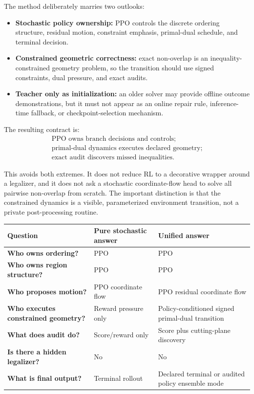 \documentclass[11pt]{article}
\begin{document}
The method deliberately marries two outlooks:
\begin{itemize}
    \item \textbf{Stochastic policy ownership:} PPO controls the discrete ordering structure, residual motion, constraint emphasis, primal-dual schedule, and terminal decision.
    \item \textbf{Constrained geometric correctness:} exact non-overlap is an inequality-constrained geometry problem, so the transition should use signed constraints, dual pressure, and exact audits.
    \item \textbf{Teacher only as initialization:} an older solver may provide offline outcome demonstrations, but it must not appear as an online repair rule, inference-time fallback, or checkpoint-selection mechanism.
\end{itemize}

The resulting contract is:
\[
\boxed{\begin{gathered}
    \text{PPO owns branch decisions and controls;}\\
    \text{primal-dual dynamics executes declared geometry;}\\
    \text{exact audit discovers missed inequalities.}
\end{gathered}}
\]

This avoids both extremes. It does not reduce RL to a decorative wrapper around a legalizer, and it does not ask a stochastic coordinate-flow head to solve all pairwise non-overlap from scratch. The important distinction is that the constrained dynamics is a visible, parameterized environment transition, not a private post-processing routine.

\begin{center}
\small
\begin{tabularx}{\textwidth}{>{\bfseries\color{navy}}p{}YY}
\toprule
Question & Pure stochastic answer & Unified answer \\
\midrule
Who owns ordering? & PPO & PPO \\
Who owns region structure? & PPO & PPO \\
Who proposes motion? & PPO coordinate flow & PPO residual coordinate flow \\
Who executes constrained geometry? & Reward pressure only & Policy-conditioned signed primal-dual transition \\
What does audit do? & Score/reward only & Score plus cutting-plane discovery \\
Is there a hidden legalizer? & No & No \\
What is final output? & Terminal rollout & Declared terminal or audited policy ensemble mode \\
\bottomrule
\end{tabularx}
\end{center}
\end{document}

